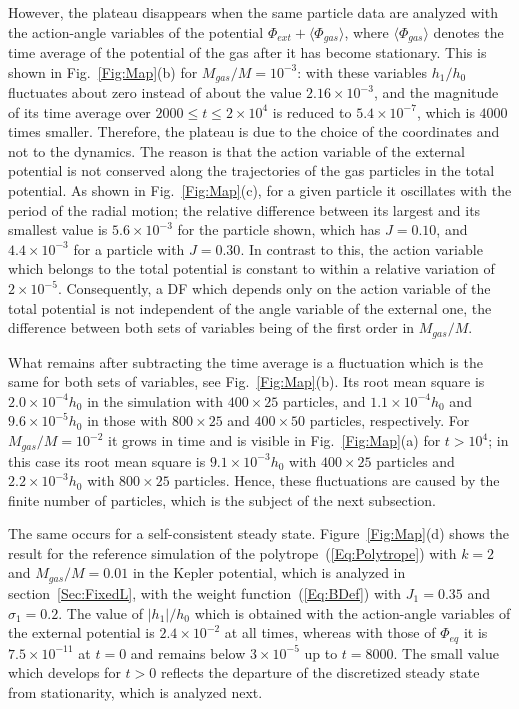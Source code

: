 However, the plateau disappears when the same particle data are analyzed with the action-angle variables of the potential $\Phi_{ext} + \langle\Phi_{gas}\rangle$, where $\langle\Phi_{gas}\rangle$ denotes the time average of the potential of the gas after it has become stationary. This is shown in Fig.~\ref{Fig:Map}(b) for $M_{gas}/M = 10^{-3}$: with these variables $h_1/h_0$ fluctuates about zero instead of about the value $2.16\times 10^{-3}$, and the magnitude of its time average over $2000\leq t\leq 2\times 10^4$ is reduced to $5.4\times 10^{-7}$, which is $4000$ times smaller. Therefore, the plateau is due to the choice of the coordinates and not to the dynamics. The reason is that the action variable of the external potential is not conserved along the trajectories of the gas particles in the total potential. As shown in Fig.~\ref{Fig:Map}(c), for a given particle it oscillates with the period of the radial motion; the relative difference between its largest and its smallest value is $5.6\times 10^{-3}$ for the particle shown, which has $J = 0.10$, and $4.4\times 10^{-3}$ for a particle with $J = 0.30$. In contrast to this, the action variable which belongs to the total potential is constant to within a relative variation of $2\times 10^{-5}$. Consequently, a DF which depends only on the action variable of the total potential is not independent of the angle variable of the external one, the difference between both sets of variables being of the first order in $M_{gas}/M$.

What remains after subtracting the time average is a fluctuation which is the same for both sets of variables, see Fig.~\ref{Fig:Map}(b). Its root mean square is $2.0\times 10^{-4} h_0$ in the simulation with $400\times 25$ particles, and $1.1\times 10^{-4} h_0$ and $9.6\times 10^{-5} h_0$ in those with $800\times 25$ and $400\times 50$ particles, respectively. For $M_{gas}/M = 10^{-2}$ it grows in time and is visible in Fig.~\ref{Fig:Map}(a) for $t > 10^4$; in this case its root mean square is $9.1\times 10^{-3} h_0$ with $400\times 25$ particles and $2.2\times 10^{-3} h_0$ with $800\times 25$ particles. Hence, these fluctuations are caused by the finite number of particles, which is the subject of the next subsection.

The same occurs for a self-consistent steady state. Figure~\ref{Fig:Map}(d) shows the result for the reference simulation of the polytrope~(\ref{Eq:Polytrope}) with $k = 2$ and $M_{gas}/M = 0.01$ in the Kepler potential, which is analyzed in section~\ref{Sec:FixedL}, with the weight function~(\ref{Eq:BDef}) with $J_1 = 0.35$ and $\sigma_1 = 0.2$. The value of $|h_1|/h_0$ which is obtained with the action-angle variables of the external potential is $2.4\times 10^{-2}$ at all times, whereas with those of $\Phi_{eq}$ it is $7.5\times 10^{-11}$ at $t = 0$ and remains below $3\times 10^{-5}$ up to $t = 8000$. The small value which develops for $t > 0$ reflects the departure of the discretized steady state from stationarity, which is analyzed next.


